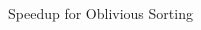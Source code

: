 \documentclass[final,hyperref={pdfpagelabels=false}]{beamer}
\begin{document}
\begin{frame}
\begin{columns}[t]
\begin{column}{.30\linewidth}
\begin{figure}[h]
\begin{minipage}{0.48\linewidth}
            \caption{Speedup for Oblivious Sorting}
        \end{minipage}
    \end{figure}

  \end{column}
  
  \end{columns}
\end{frame}
\end{document}
